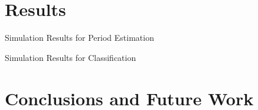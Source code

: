 \documentclass[12pt]{beamer}
\newcommand{\argmin}[1]{\underset{#1}{\operatorname{argmin}}\text{ }}
\begin{document}
\section{Results}

\begin{frame}{Simulation Results for Period Estimation}


\end{frame}


\begin{frame}{Simulation Results for Classification}


\end{frame}


\section{Conclusions and Future Work}







\end{document}
